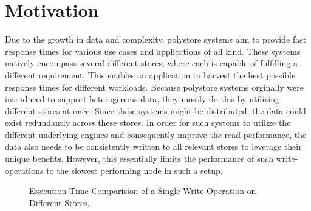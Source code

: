 
\section{Motivation}

Due to the growth in data and complexity, polystore systems aim to provide fast response times for various use cases and applications of all kind.
These systems natively encompass several different stores, where each is capable of fulfilling a different requirement. 
This enables an application to harvest the best possible response times for different workloads.
Because polystore systems orginally were introduced to support heterogenous data, they mostly do this by utilizing different stores at once.
Since these systems might be distributed, the data could exist redundantly across these stores. 
In order for such systems to utilize the different underlying engines and consequently improve the read-performance, 
the data also needs to be consistently written to all relevant stores to leverage their unique benefits.
However, this essentially limits the performance of such write-operations to the slowest performing node in such a setup.

 

\begin{figure}[t] 
    \centering 
\caption{Execution Time Comparision of a Single Write-Operation on Different Stores.}
\label{fig:stores}
\end{figure}


